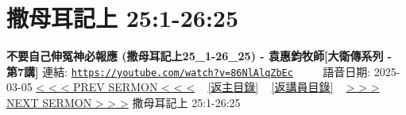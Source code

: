\documentclass{book}
\begin{document}
\section{撒母耳記上 25:1-26:25}
\label{sec:86NlAlqZbEc}
\textbf{不要自己伸冤神必報應 (撒母耳記上25\_1-26\_25) - 袁惠鈞牧師[大衛傳系列 - 第7講]}
\newline
\newline
連結: \href{https://youtube.com/watch?v=86NlAlqZbEc}{\texttt{https://youtube.com/watch?v=86NlAlqZbEc}} ~~~~ 語音日期: 2025-03-05
\newline
\newline
\hyperref[sec:GqTOPwqfjwM]{< < < PREV SERMON < < <}
~
\hyperlink{toc}{[返主目錄]}
~
\hyperref[ch:preacher12]{[返講員目錄]}
~
\hyperref[sec:KIOzsSOi_wU]{> > > NEXT SERMON > > >}
\newline
\newline
撒母耳記上 25:1-26:25
\newline
\end{document}
